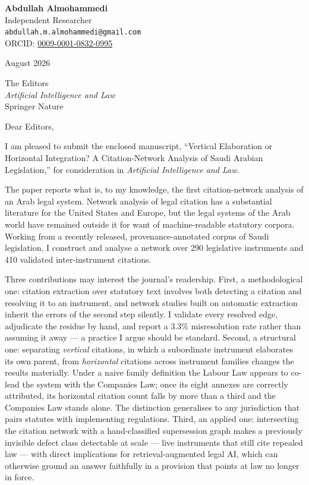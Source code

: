 \documentclass[10.5pt]{letter}
\begin{document}
\noindent
{\large\textbf{Abdullah Almohammedi}}\\
Independent Researcher\\
\texttt{abdullah.m.almohammedi@gmail.com}\\
ORCID: \href{https://orcid.org/0009-0001-0832-0995}{0009-0001-0832-0995}

\vspace{0.8em}
 August 2026

\vspace{0.8em}
\noindent The Editors\\
\emph{Artificial Intelligence and Law}\\
Springer Nature

\vspace{0.9em}
\noindent Dear Editors,

\vspace{0.6em}
I am pleased to submit the enclosed manuscript, ``Vertical Elaboration or
Horizontal Integration? A Citation-Network Analysis of Saudi Arabian
Legislation,'' for consideration in \emph{Artificial Intelligence and Law}.

\vspace{0.5em}
The paper reports what is, to my knowledge, the first citation-network
analysis of an Arab legal system. Network analysis of legal citation has a
substantial literature for the United States and Europe, but the legal
systems of the Arab world have remained outside it for want of
machine-readable statutory corpora. Working from a recently released,
provenance-annotated corpus of Saudi legislation, I construct and analyse a
network over 290 legislative instruments and 410 validated inter-instrument
citations.

\vspace{0.5em}
Three contributions may interest the journal's readership. First, a
methodological one: citation extraction over statutory text involves both
detecting a citation and resolving it to an instrument, and network studies
built on automatic extraction inherit the errors of the second step
silently. I validate every resolved edge, adjudicate the residue by hand,
and report a 3.3\% misresolution rate rather than assuming it away ---
a practice I argue should be standard. Second, a structural one: separating
\emph{vertical} citations, in which a subordinate instrument elaborates its
own parent, from \emph{horizontal} citations across instrument families
changes the results materially. Under a naive family definition the Labour
Law appears to co-lead the system with the Companies Law; once its eight
annexes are correctly attributed, its horizontal citation count falls by
more than a third and the Companies Law stands alone. The distinction
generalises to any jurisdiction that pairs statutes with implementing
regulations. Third, an applied one: intersecting the citation network with a
hand-classified supersession graph makes a previously invisible defect class
detectable at scale --- live instruments that still cite repealed law ---
with direct implications for retrieval-augmented legal AI, which can
otherwise ground an answer faithfully in a provision that points at law no
longer in force.
\end{document}
